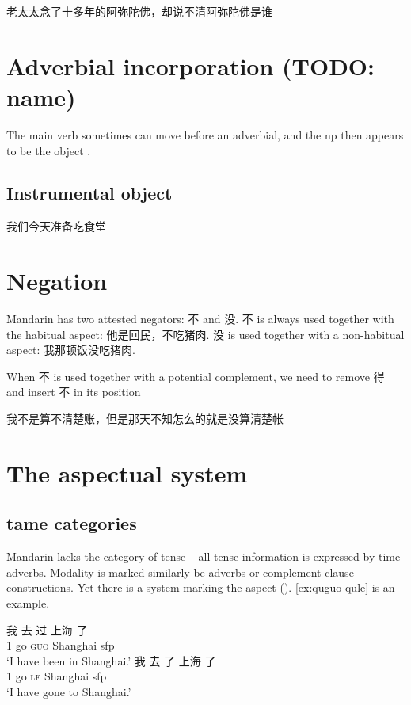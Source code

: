 \documentclass[UTF8, a4paper, oneside, scheme=plain]{ctexrep}
\newcommand*{\citesec}[1]{\S~{#1}}
\newcommand*{\citechap}[1]{chap.~{#1}}
\newcommand{\asis}[1]{\textsc{#1}}
\newcommand{\translate}[1]{`#1'}
\begin{document}
\begin{exe}
    \ex\label{ex:verb-phrase.separation.nianfo-full-vp} 老太太念了十多年的阿弥陀佛，却说不清阿弥陀佛是谁
\end{exe}

\section{Adverbial incorporation (TODO: name)}

The main verb sometimes can move before an adverbial, 
and the \acs{np} then appears to be the object
\citep[\citechap{4}, \citesec{5}]{feng2000}.

\subsection{Instrumental object}

\begin{exe}
    \ex 我们今天准备吃食堂
\end{exe}

\section{Negation}

Mandarin has two attested negators: 不 and 没.
不 is always used together with the habitual aspect:
他是回民，不吃猪肉.
没 is used together with a non-habitual aspect:
我那顿饭没吃猪肉.

When 不 is used together with a potential complement, 
we need to remove 得 and insert 不 in its position

我不是算不清楚账，但是那天不知怎么的就是没算清楚帐

\section{The aspectual system}\label{sec:aspectual}

\subsection{\acs{tame} categories}

Mandarin lacks the category of tense -- 
all tense information is expressed by time adverbs.
Modality is marked similarly be adverbs or complement clause constructions.
Yet there is a system marking the aspect (). 
\eqref{ex:quguo-qule} is an example.

\begin{exe}
    \ex \begin{xlist}
        \ex \gll 我 去 过 上海 了 \\
        1 go \asis{guo} Shanghai \acs{sfp} \\
        \glt \translate{I have been in Shanghai.}
        \ex \gll 我 去 了 上海 了 \\
        1 go \asis{le} Shanghai \acs{sfp} \\
        \glt \translate{I have gone to Shanghai.}
    \end{xlist}
    \label{ex:quguo-qule}
\end{exe}
\end{document}

